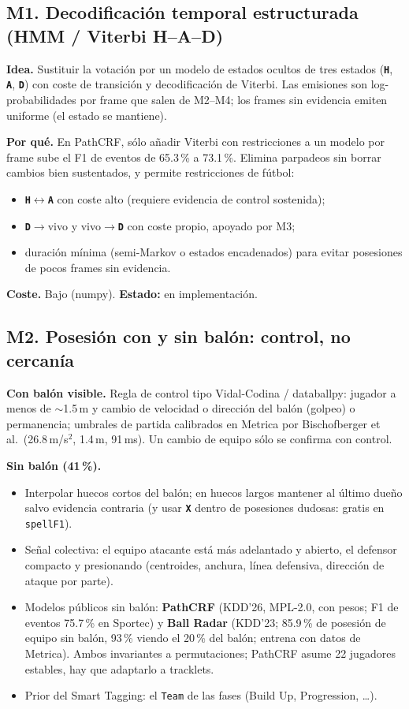 \documentclass[11pt,a4paper]{article}
\newcommand{\lab}[1]{\texttt{\textbf{#1}}}
\begin{document}
\subsection{M1. Decodificaci\'on temporal estructurada (HMM / Viterbi H--A--D)}
\textbf{Idea.} Sustituir la votaci\'on por un modelo de estados ocultos de tres estados
(\lab{H}, \lab{A}, \lab{D}) con coste de transici\'on y decodificaci\'on de Viterbi. Las
emisiones son log-probabilidades por frame que salen de M2--M4; los frames sin evidencia emiten
uniforme (el estado se mantiene).

\textbf{Por qu\'e.} En PathCRF, s\'olo a\~nadir Viterbi con restricciones a un modelo por frame
sube el F1 de eventos de 65.3\,\% a 73.1\,\%. Elimina parpadeos sin borrar cambios bien
sustentados, y permite restricciones de f\'utbol:
\begin{itemize}
  \item \lab{H}$\leftrightarrow$\lab{A} con coste alto (requiere evidencia de control sostenida);
  \item \lab{D}$\to$vivo y vivo$\to$\lab{D} con coste propio, apoyado por M3;
  \item duraci\'on m\'inima (semi-Markov o estados encadenados) para evitar posesiones de pocos
        frames sin evidencia.
\end{itemize}
\textbf{Coste.} Bajo (numpy). \textbf{Estado:} en implementaci\'on.

\subsection{M2. Posesi\'on con y sin bal\'on: control, no cercan\'ia}
\textbf{Con bal\'on visible.} Regla de control tipo Vidal-Codina / databallpy: jugador a menos
de $\sim$1.5\,m y cambio de velocidad o direcci\'on del bal\'on (golpeo) o permanencia; umbrales de
partida calibrados en Metrica por Bischofberger et al.\ (26.8\,m/s$^2$, 1.4\,m, 91\,ms). Un
cambio de equipo s\'olo se confirma con control.

\textbf{Sin bal\'on (41\,\%).}
\begin{itemize}
  \item Interpolar huecos cortos del bal\'on; en huecos largos mantener al \'ultimo due\~no salvo
        evidencia contraria (y usar \lab{X} dentro de posesiones dudosas: gratis en
        \texttt{spellF1}).
  \item Se\~nal colectiva: el equipo atacante est\'a m\'as adelantado y abierto, el defensor
        compacto y presionando (centroides, anchura, l\'inea defensiva, direcci\'on de ataque por
        parte).
  \item Modelos p\'ublicos sin bal\'on: \textbf{PathCRF} (KDD'26, MPL-2.0, con pesos; F1 de
        eventos 75.7\,\% en Sportec) y \textbf{Ball Radar} (KDD'23; 85.9\,\% de posesi\'on de
        equipo sin bal\'on, 93\,\% viendo el 20\,\% del bal\'on; entrena con datos de Metrica).
        Ambos invariantes a permutaciones; PathCRF asume 22 jugadores estables, hay que
        adaptarlo a tracklets.
  \item Prior del Smart Tagging: el \texttt{Team} de las fases (Build Up, Progression, \ldots).
\end{itemize}
\end{document}
